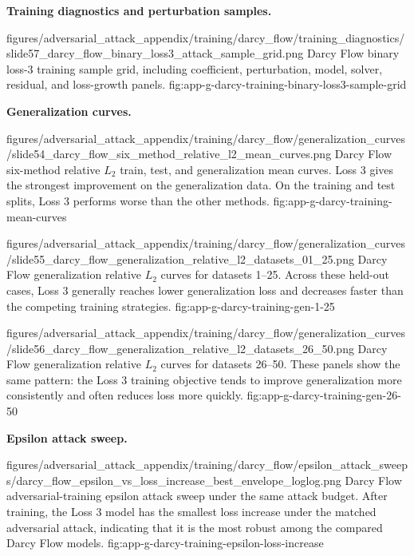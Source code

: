 \documentclass[letterpaper]{article} %
\newcounter{appendixsection}
\newcounter{appendixsubsection}[appendixsection]
\newcounter{appendixdomain}[appendixsubsection]
\begin{document}
\clearpage
{}

\noindent\textbf{Training diagnostics and perturbation samples.}

\appendixattackfig
  {figures/adversarial_attack_appendix/training/darcy_flow/training_diagnostics/slide57_darcy_flow_binary_loss3_attack_sample_grid.png}
  {Darcy Flow binary loss-3 training sample grid, including coefficient,
  perturbation, model, solver, residual, and loss-growth panels.}
  {fig:app-g-darcy-training-binary-loss3-sample-grid}

\noindent\textbf{Generalization curves.}

\appendixattackfigfullwidth
  {figures/adversarial_attack_appendix/training/darcy_flow/generalization_curves/slide54_darcy_flow_six_method_relative_l2_mean_curves.png}
  {Darcy Flow six-method relative $L_2$ train, test, and generalization mean
  curves. Loss 3 gives the strongest improvement on the generalization data. On
  the training and test splits, Loss 3 performs worse than the other methods.}
  {fig:app-g-darcy-training-mean-curves}

\clearpage

\appendixattackfigfullwidth
  {figures/adversarial_attack_appendix/training/darcy_flow/generalization_curves/slide55_darcy_flow_generalization_relative_l2_datasets_01_25.png}
  {Darcy Flow generalization relative $L_2$ curves for datasets 1--25. Across
  these held-out cases, Loss 3 generally reaches lower generalization loss and
  decreases faster than the competing training strategies.}
  {fig:app-g-darcy-training-gen-1-25}

\clearpage

\appendixattackfigfullwidth
  {figures/adversarial_attack_appendix/training/darcy_flow/generalization_curves/slide56_darcy_flow_generalization_relative_l2_datasets_26_50.png}
  {Darcy Flow generalization relative $L_2$ curves for datasets 26--50. These
  panels show the same pattern: the Loss 3 training objective tends to improve
  generalization more consistently and often reduces loss more quickly.}
  {fig:app-g-darcy-training-gen-26-50}

\clearpage
\noindent\textbf{Epsilon attack sweep.}

\appendixattackfig
  {figures/adversarial_attack_appendix/training/darcy_flow/epsilon_attack_sweeps/darcy_flow_epsilon_vs_loss_increase_best_envelope_loglog.png}
  {Darcy Flow adversarial-training epsilon attack sweep under the same attack
  budget. After training, the Loss 3 model has the smallest loss increase under
  the matched adversarial attack, indicating that it is the most robust among
  the compared Darcy Flow models.}
  {fig:app-g-darcy-training-epsilon-loss-increase}
\end{document}
